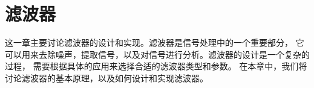 \section{滤波器}

这一章主要讨论滤波器的设计和实现。滤波器是信号处理中的一个重要部分，
它可以用来去除噪声，提取信号，以及对信号进行分析。滤波器的设计是一个复杂的过程，
需要根据具体的应用来选择合适的滤波器类型和参数。
在本章中，我们将讨论滤波器的基本原理，以及如何设计和实现滤波器。


% 
% 
